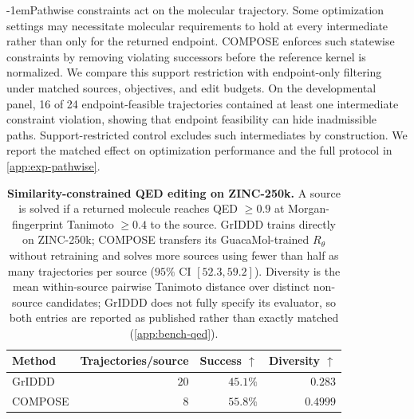 \documentclass{article}
\makeatletter
\theoremstyle{definition}
\theoremstyle{remark}
\def\paragraph{\@startsection{paragraph}{4}{\z@}{1.0ex plus 0.3ex minus .2ex}%
  {-1em}{\normalsize\bf}}
\makeatother
\begin{document}
\paragraph{Pathwise constraints act on the molecular trajectory.}
Some optimization settings may necessitate molecular requirements to hold at every intermediate rather than only for the returned endpoint. COMPOSE enforces such statewise constraints by removing
violating successors before the reference kernel is normalized. We compare this
support restriction with endpoint-only filtering under matched sources,
objectives, and edit budgets. On the developmental panel, 16 of 24 endpoint-feasible trajectories contained at least one intermediate constraint violation, showing that endpoint feasibility
can hide inadmissible paths. Support-restricted control excludes such
intermediates by construction. We report the matched effect on optimization
performance and the full protocol in \cref{app:exp-pathwise}.

\begin{table}[t]
\centering\small\setlength{\tabcolsep}{7pt}
\begin{tabular}{@{}lrrr@{}}
\toprule
Method & Trajectories/source & Success $\uparrow$ & Diversity $\uparrow$ \\
\midrule
GrIDDD  & $20$ & $45.1\%$          & $0.283$ \\
COMPOSE & $8$  & $\mathbf{55.8\%}$ & $\mathbf{0.4999}$ \\
\bottomrule
\end{tabular}
\caption{\small\textbf{Similarity-constrained QED editing on ZINC-250k.} A source is solved
if a returned molecule reaches QED $\geq0.9$ at Morgan-fingerprint Tanimoto $\geq0.4$ to the
source. GrIDDD trains directly on ZINC-250k; COMPOSE transfers its GuacaMol-trained
$R_\theta$ without retraining and solves more sources using fewer than half as many
trajectories per source ($95\%$ CI $[52.3,59.2]$). Diversity is the mean within-source
pairwise Tanimoto distance over distinct non-source candidates; GrIDDD does not fully
specify its evaluator, so both entries are reported as published rather than exactly
matched (\cref{app:bench-qed}).}
\label{tab:external}
\end{table}
\end{document}
